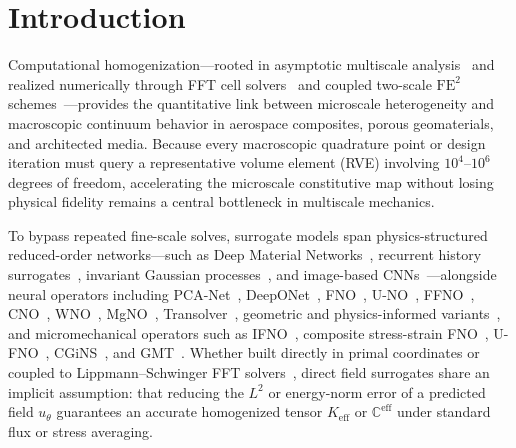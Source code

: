 \documentclass[preprint,11pt]{elsarticle}
\newcommand{\Keff}{K_{\mathrm{eff}}}
\newcommand{\Ceff}{\mathbb{C}^{\mathrm{eff}}}
\begin{document}
\section{Introduction}\label{sec:intro}

Computational homogenization—rooted in asymptotic multiscale analysis~\cite{bensoussan1978asymptotic,nemat1999micromechanics,milton2002theory} and realized numerically through FFT cell solvers~\cite{moulinec1998numerical,michel1999effective,schneider2021review} and coupled two-scale $\mathrm{FE}^2$ schemes~\cite{feyel2000fe2,miehe2002strain,geers2010multiscale,matous2017review}—provides the quantitative link between microscale heterogeneity and macroscopic continuum behavior in aerospace composites, porous geomaterials, and architected media. Because every macroscopic quadrature point or design iteration must query a representative volume element (RVE) involving $10^4$--$10^6$ degrees of freedom, accelerating the microscale constitutive map without losing physical fidelity remains a central bottleneck in multiscale mechanics.

To bypass repeated fine-scale solves, surrogate models span physics-structured reduced-order networks—such as Deep Material Networks~\cite{liu2019dmn}, recurrent history surrogates~\cite{ghavamian2019accelerating,mozaffar2019deep}, invariant Gaussian processes~\cite{fuhg2022physics}, and image-based CNNs~\cite{mianroodi2021teaching}—alongside neural operators including PCA-Net~\cite{bhattacharya2021model}, DeepONet~\cite{lu2021deeponet,lu2022fair}, FNO~\cite{li2021fno,kovachki2023neural}, U-NO~\cite{rahman2023uno}, FFNO~\cite{tran2023ffno}, CNO~\cite{raonic2023cno}, WNO~\cite{tripura2023wno}, MgNO~\cite{he2024mgno}, Transolver~\cite{wu2024transolver}, geometric and physics-informed variants~\cite{li2023geofno,li2023gino,li2024pino}, and micromechanical operators such as IFNO~\cite{you2022ifno}, composite stress-strain FNO~\cite{rashid2022learning}, U-FNO~\cite{nguyen2026ufno}, CGiNS~\cite{xing2025cgins}, and GMT~\cite{xing2026gmt}. Whether built directly in primal coordinates or coupled to Lippmann--Schwinger FFT solvers~\cite{eyre1999fast,brisard2010fft,zeman2010accelerating,monchiet2012polarization,kabel2014efficient,willot2015fourier}, direct field surrogates share an implicit assumption: that reducing the $L^2$ or energy-norm error of a predicted field $u_\theta$ guarantees an accurate homogenized tensor $\Keff$ or $\Ceff$ under standard flux or stress averaging.
\end{document}
